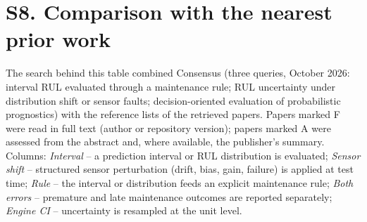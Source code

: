 \section*{S8. Comparison with the nearest prior work}
\noindent The search behind this table combined Consensus (three queries, October 2026: interval RUL evaluated through a maintenance rule; RUL uncertainty under distribution shift or sensor faults; decision-oriented evaluation of probabilistic prognostics) with the reference lists of the retrieved papers. Papers marked F were read in full text (author or repository version); papers marked A were assessed from the abstract and, where available, the publisher's summary. Columns: \emph{Interval} -- a prediction interval or RUL distribution is evaluated; \emph{Sensor shift} -- structured sensor perturbation (drift, bias, gain, failure) is applied at test time; \emph{Rule} -- the interval or distribution feeds an explicit maintenance rule; \emph{Both errors} -- premature and late maintenance outcomes are reported separately; \emph{Engine CI} -- uncertainty is resampled at the unit level.
